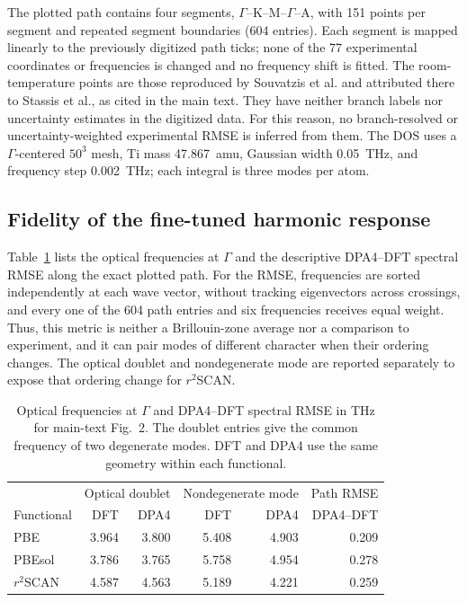 \documentclass[10pt]{article}
\newcommand{\rscan}{\ensuremath{r^{2}}SCAN}
\begin{document}
The plotted path contains four segments, $\Gamma$--K--M--$\Gamma$--A, with 151 points per segment and repeated segment boundaries (604 entries).
Each segment is mapped linearly to the previously digitized path ticks; none of the 77 experimental coordinates or frequencies is changed and no frequency shift is fitted.
The room-temperature points are those reproduced by Souvatzis et al. and attributed there to Stassis et al., as cited in the main text. They have neither branch labels nor uncertainty estimates in the digitized data.
For this reason, no branch-resolved or uncertainty-weighted experimental RMSE is inferred from them.
The DOS uses a $\Gamma$-centered $50^3$ mesh, Ti mass 47.867~amu, Gaussian width 0.05~THz, and frequency step 0.002~THz; each integral is three modes per atom.

\subsection{Fidelity of the fine-tuned harmonic response}
Table~\ref{tab:matched_phonons} lists the optical frequencies at $\Gamma$ and the descriptive DPA4--DFT spectral RMSE along the exact plotted path.
For the RMSE, frequencies are sorted independently at each wave vector, without tracking eigenvectors across crossings, and every one of the 604 path entries and six frequencies receives equal weight.
Thus, this metric is neither a Brillouin-zone average nor a comparison to experiment, and it can pair modes of different character when their ordering changes.
The optical doublet and nondegenerate mode are reported separately to expose that ordering change for \rscan{}.

\begin{table}[htbp]
\centering
\caption{Optical frequencies at $\Gamma$ and DPA4--DFT spectral RMSE in THz for main-text Fig.~2. The doublet entries give the common frequency of two degenerate modes. DFT and DPA4 use the same geometry within each functional.}
\label{tab:matched_phonons}
\begin{tabular}{lrrrrr}
\toprule
 & \multicolumn{2}{c}{Optical doublet} & \multicolumn{2}{c}{Nondegenerate mode} & Path RMSE\\
Functional & DFT & DPA4 & DFT & DPA4 & DPA4--DFT\\
\midrule
PBE & 3.964 & 3.800 & 5.408 & 4.903 & 0.209\\
PBEsol & 3.786 & 3.765 & 5.758 & 4.954 & 0.278\\
\rscan{} & 4.587 & 4.563 & 5.189 & 4.221 & 0.259\\
\bottomrule
\end{tabular}
\end{table}
\end{document}

